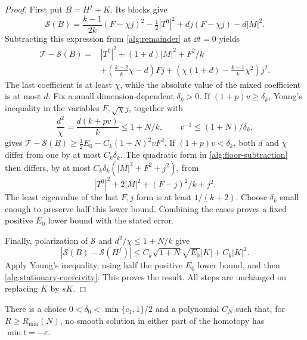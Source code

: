 \begin{proof}
First put $B=H^f+K$.  Its blocks give
\[
 \mathcal S(B)=\frac{k-1}{2k}(F-\chi j)^2
 -\tfrac12|T^0|^2+dj(F-\chi j)-d|M|^2.
\]
Subtracting this expression from \eqref{alg:remainder} at $\dd t=0$
yields
\begin{equation}
\begin{split}
 \mathcal T-\mathcal S(B)={}&|T^0|^2+(1+d)|M|^2+F^2/k\\
 &+\left(\frac{k-2}{k}\chi-d\right)Fj
 +\left(\chi(1+d)-\frac{k-1}{k}\chi^2\right)j^2.
\end{split}
\label{alg:floor-subtraction}
\end{equation}
The last coefficient is at least $\chi$, while the absolute value of
the mixed coefficient is at most $d$.  Fix a small dimension-dependent
$\delta_k>0$.  If $(1+p)v\geq\delta_k$, Young's inequality in
the variables $F,\sqrt\chi j$, together with
\[
 \frac{d^2}{\chi}=\frac{d(k+pv)}k\leq1+N/k,
 \qquad v^{-1}\leq(1+N)/\delta_k,
\]
gives
$\mathcal T-\mathcal S(B)\geq\tfrac12E_0
 -C_k(1+N)^2vF^2$.
If $(1+p)v<\delta_k$, both $d$ and $\chi$ differ from one by at
most $C_k\delta_k$.  The quadratic form in
\eqref{alg:floor-subtraction} then differs, by at most
$C_k\delta_k(|M|^2+F^2+j^2)$, from
\[
 |T^0|^2+2|M|^2+(F-j)^2/k+j^2.
\]
The least eigenvalue of the last $F,j$ form is at least $1/(k+2)$.
Choose $\delta_k$ small enough to preserve half this lower bound.
Combining the cases proves a fixed positive $E_0$ lower bound with
the stated error.

Finally, polarization of $\mathcal S$ and
$d^2/\chi\leq1+N/k$ give
\[
 |\mathcal S(B)-\mathcal S(H^f)|
 \leq C_k\sqrt{1+N}\sqrt{E_0}|K|+C_k|K|^2.
\]
Apply Young's inequality, using half the positive $E_0$ lower bound,
and then \eqref{alg:stationary-coercivity}.  This proves the result.
All steps are unchanged on replacing $K$ by $sK$.
\end{proof}

\begin{lemma}
\label{alg:floor}
There is a choice $0<\delta_0<\min\{c_1,1\}/2$ and a polynomial
$C_N$ such that, for $R\geq R_{\min}(N)$, no smooth solution in
either part of the homotopy has $\min t=-\varepsilon$.
\end{lemma}

